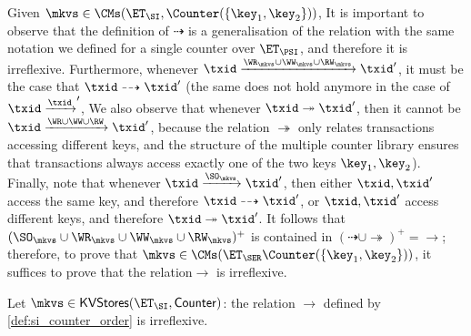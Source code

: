 Given $\mkvs \in \CMs(\ET_{\SI}, \Counter(\{\key_1, \key_2\}))$, 
It is important to observe that the definition of $\dashrightarrow$ is a generalisation of the relation 
with the same notation we defined for a single counter over $\ET_{\PSI}$, and therefore it is irreflexive. 
Furthermore, whenever $\txid \xrightarrow{\WR_{\mkvs} \cup \WW_{\mkvs} \cup \RW_{\mkvs}} \txid'$, it must be the case that 
$\txid \dashrightarrow \txid'$ (the same does not hold anymore in the case of $\txid \xrightarrow \txid'$, 
We also observe that whenever $\txid \twoheadrightarrow \txid'$, then it cannot be $\txid \xrightarrow{\WR \cup \WW \cup \RW} \txid'$, 
because the relation $\twoheadrightarrow$ only relates transactions accessing different keys, and the structure of 
the multiple counter library ensures that transactions always access exactly one of the two keys $\key_1, \key_2$). 
Finally, note that whenever $\txid \xrightarrow{\SO_{\mkvs}} \txid'$, then either $\txid, \txid'$ access the same 
key, and therefore $\txid \dashrightarrow \txid'$, or $\txid, \txid'$ access different keys, and therefore 
$\txid \twoheadrightarrow \txid'$. It follows that $(\SO_{\mkvs} \cup \WR_{\mkvs} \cup \WW_{\mkvs} \cup \RW_{\mkvs})^{+}$ 
is contained in $(\dashrightarrow \cup \twoheadrightarrow)^{+} = \rightarrow$; therefore, 
to prove that $\mkvs \in \CMs(\ET_{\SER}  \Counter(\{\key_1, \key_2\}))$, it suffices to prove that 
the relation$\rightarrow$ is irreflexive.
%

\begin{proposition}
Let $\mkvs \in \mathsf{KVStores}(\ET_{\SI}, \mathsf{Counter})$: the relation $\rightarrow$ 
defined by \cref{def:si_counter_order} is irreflexive.
\end{proposition}

